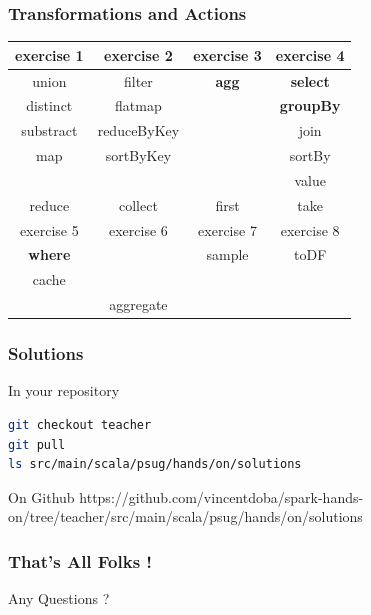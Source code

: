\documentclass[slidetop,9pt,utf8]{beamer}
\begin{document}
\begin{CJK}{UTF8}{gbsn}
\begin{frame}

  \frametitle{Transformations and Actions}
  
  \LARGE
  \begin{center}
    \begin{tabular}{|c|c|c|c|}
      \hline
      \rowcolor{gray} exercise 1 & exercise 2 & exercise 3 & exercise 4 \\ \hline
      union & filter & \textbf{agg} & \textbf{select} \\
      distinct & flatmap & & \textbf{groupBy} \\
      substract & reduceByKey & & join \\
      map & sortByKey & & sortBy \\ 
       & & & value \\ \hline
      \rowcolor{lightgray} reduce & collect & first & take \\ \hline
      \rowcolor{gray} exercise 5 & exercise 6 & exercise 7 & exercise 8 \\ \hline
      \textbf{where} & & sample & toDF \\
      cache & & & \\ \hline
      \rowcolor{lightgray}   & aggregate & & \\ \hline
    \end{tabular}
  \end{center}
  \normalsize
\end{frame}

\begin{frame}[fragile]
  \frametitle{Solutions}

  \begin{block}{In your repository}

    \begin{lstlisting}[language=bash, style=terminal-large]
git checkout teacher
git pull
ls src/main/scala/psug/hands/on/solutions 
    \end{lstlisting}
  
  \end{block}

  \begin{block}{On Github}
    https://github.com/vincentdoba/spark-hands-on/tree/teacher/src/main/scala/psug/hands/on/solutions
  \end{block}

\end{frame}

\begin{frame}

  \frametitle{That's All Folks !}
  
  
  \begin{center}
    \Huge Any Questions ?\normalsize
  \end{center}
\end{frame}


\end{CJK}
\end{document}
